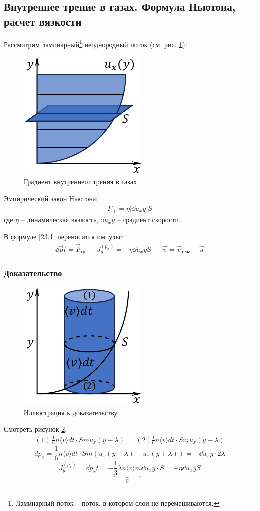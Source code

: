 \subsection{Внутреннее трение в газах. Формула Ньютона, расчет вязкости}

Рассмотрим ламинарный\footnote{Ламинарный поток -- поток, в котором слои не перемешиваются.} неоднородный поток (см. рис. \ref{fig:12}):
\begin{figure}
	\centering
	\includegraphics[width=0.4\linewidth]{"image/Внутрение трение"}
	\caption{Градиент внутреннего трения в газах}
	\label{fig:12}
\end{figure}

Эмпирический закон Ньютона:
\begin{align} \label{23.1}
	\boxed{
		F_\text{тр} = \eta \left|\dd{u_x}{y}\right|S
	}
\end{align}
где $\eta$ -- динамическая вязкость, $\dd{u_x}{y}$ -- градиент скорости.

В формуле \eqref{23.1} переносится импульс:
\begin{align*}
	\dd{\vec{p}}{t} = \vec{F}_\text{тр} && J_y^{(p_x)} = -\eta \dd{u_x}{y} S && \vec{v} =\vec{v}_\text{тела} + \vec{u}
\end{align*}
\subsubsection*{Доказательство}
\begin{figure}
	\centering
	\includegraphics[width=0.4\linewidth]{"image/Внутрение трение 2"}
	\caption{Иллюстрация к доказательству}
	\label{fig:13}
\end{figure}
Смотреть рисунок \ref{fig:13}:
\begin{align*}
	(1) \, \frac{1}{6} n \langle v \rangle dt \cdot Smu_x(y-\lambda) && (2) \frac{1}{6} n \langle v \rangle dt \cdot Smu_x(y+\lambda)
\end{align*}
\[dp_x = \frac{1}{6} n \langle v \rangle dt \cdot Sm(u_x(y - \lambda) - u_x(y + \lambda)) = - \dd{u_x}{y}\cdot 2\lambda\]
\[\boxed{J_y^{(p_x)} = \dd{p_x}{t} = - \underbrace{\frac{1}{3}\lambda n \langle v \rangle m}_\eta \dd{u_x}{y} \cdot S = - \eta \dd{u_x}{y}S}\]

